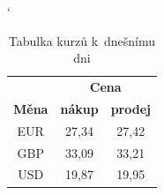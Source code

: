 \documentclass[11pt,a4paper,titlepage]{article}
\begin{document}
\begin{table}[ht]
\catcode`
\begin{center}
\begin{tabular}{|c|c|c|}
\hline
 & \multicolumn{2}{|c|}{\bfseries Cena}\\ \cline{2-3}
\bfseries Měna & \bfseries nákup & \bfseries prodej\\ \hline
EUR & 27,34 & 27,42\\
GBP & 33,09 & 33,21\\
USD & 19,87 & 19,95\\ \hline
\end{tabular}

\caption{Tabulka kurzů k~dnešnímu dni}
\label{tab:kurz}
\end{center}
\end{table}
\end{document}
